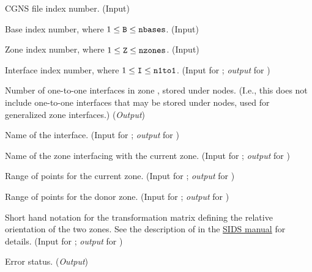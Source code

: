 \begin{Ventryi}{}\raggedright
\item [\fort{fn}]
      CGNS file index number.
      (\textcolor{input}{Input})
\item [\fort{B}]
      Base index number, where $1 \leq \text{{\normalfont\texttt{B}}} \leq \text{{\normalfont\texttt{nbases}}}$.
      (\textcolor{input}{Input})
\item [\fort{Z}]
      Zone index number, where $1 \leq \text{{\normalfont\texttt{Z}}} \leq \text{{\normalfont\texttt{nzones}}}$.
      (\textcolor{input}{Input})
\item [\fort{I}]
      Interface index number, where $1 \leq \text{{\normalfont\texttt{I}}} \leq \text{{\normalfont\texttt{n1to1}}}$.
      (\textcolor{input}{Input} for ;
      \textcolor{output}{\textit{output}} for )
\item [\fort{n1to1}]
      Number of one-to-one interfaces in zone , stored under
       nodes.
      (I.e., this does not include one-to-one interfaces that may be
      stored under  nodes, used for
      generalized zone interfaces.)
      (\textcolor{output}{\textit{Output}})
\item [\fort{connectname}]
      Name of the interface.
      (\textcolor{input}{Input} for ;
      \textcolor{output}{\textit{output}} for )
\item [\fort{donorname}]
      Name of the zone interfacing with the current zone.
      (\textcolor{input}{Input} for ;
      \textcolor{output}{\textit{output}} for )
\item [\fort{range}]
      Range of points for the current zone.
      (\textcolor{input}{Input} for ;
      \textcolor{output}{\textit{output}} for )
\item [\fort{donor\_range}]
      Range of points for the donor zone.
      (\textcolor{input}{Input} for ;
      \textcolor{output}{\textit{output}} for )
\item [\fort{transform}]
      Short hand notation for the transformation matrix defining the
      relative orientation of the two zones.
      See the description of  in the
      \href{../sids/sids.pdf}{SIDS manual} for details.
      (\textcolor{input}{Input} for ;
      \textcolor{output}{\textit{output}} for )
\item [\fort{ier}]
      Error status.
      (\textcolor{output}{\textit{Output}})
\end{Ventryi}


